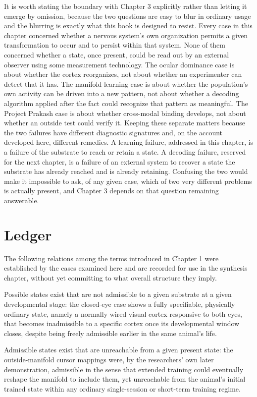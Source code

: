 \documentclass[11pt]{book}
\begin{document}
It is worth stating the boundary with Chapter 3 explicitly rather than letting it emerge by omission, because the two questions are easy to blur in ordinary usage and the blurring is exactly what this book is designed to resist. Every case in this chapter concerned whether a nervous system's own organization permits a given transformation to occur and to persist within that system. None of them concerned whether a state, once present, could be read out by an external observer using some measurement technology. The ocular dominance case is about whether the cortex reorganizes, not about whether an experimenter can detect that it has. The manifold-learning case is about whether the population's own activity can be driven into a new pattern, not about whether a decoding algorithm applied after the fact could recognize that pattern as meaningful. The Project Prakash case is about whether cross-modal binding develops, not about whether an outside test could verify it. Keeping these separate matters because the two failures have different diagnostic signatures and, on the account developed here, different remedies. A learning failure, addressed in this chapter, is a failure of the substrate to reach or retain a state. A decoding failure, reserved for the next chapter, is a failure of an external system to recover a state the substrate has already reached and is already retaining. Confusing the two would make it impossible to ask, of any given case, which of two very different problems is actually present, and Chapter 3 depends on that question remaining answerable.

\section{Ledger}

The following relations among the terms introduced in Chapter 1 were established by the cases examined here and are recorded for use in the synthesis chapter, without yet committing to what overall structure they imply.

Possible states exist that are not admissible to a given substrate at a given developmental stage: the closed-eye case shows a fully specifiable, physically ordinary state, namely a normally wired visual cortex responsive to both eyes, that becomes inadmissible to a specific cortex once its developmental window closes, despite being freely admissible earlier in the same animal's life.

Admissible states exist that are unreachable from a given present state: the outside-manifold cursor mappings were, by the researchers' own later demonstration, admissible in the sense that extended training could eventually reshape the manifold to include them, yet unreachable from the animal's initial trained state within any ordinary single-session or short-term training regime.
\end{document}
